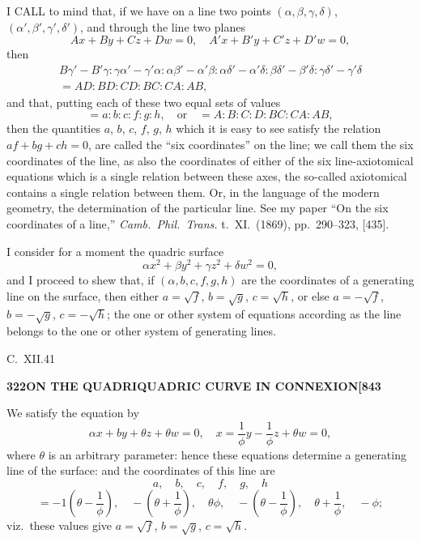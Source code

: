 \documentclass[11pt,a4paper]{book}
\begin{document}
\noindent I CALL to mind that, if we have on a line two points $(\alpha, \beta, \gamma, \delta)$, $(\alpha', \beta', \gamma', \delta')$, and through the line two planes
\[
Ax + By + Cz + Dw = 0, \quad A'x + B'y + C'z + D'w = 0,
\]
then
\begin{align*}
B\gamma' - B'\gamma : \gamma\alpha' - \gamma'\alpha : \alpha\beta' - \alpha'\beta : \alpha\delta' - \alpha'\delta : \beta\delta' - \beta'\delta : \gamma\delta' - \gamma'\delta \\
= AD : BD : CD : BC : CA : AB,
\end{align*}
and that, putting each of these two equal sets of values
\[
= a : b : c : f : g : h, \quad \text{or} \quad = A : B : C : D : BC : CA : AB,
\]
then the quantities $a$, $b$, $c$, $f$, $g$, $h$ which it is easy to see satisfy the relation $af + bg + ch = 0$, are called the ``six coordinates'' on the line; we call them the six coordinates of the line, as also the coordinates of either of the six line-axiotomical equations which is a single relation between these axes, the so-called axiotomical contains a single relation between them. Or, in the language of the modern geometry, the determination of the particular line. See my paper ``On the six coordinates of a line,'' \textit{Camb.\ Phil.\ Trans.} t.\ XI.\ (1869), pp.\ 290--323, [435].

I consider for a moment the quadric surface
\[
\alpha x^2 + \beta y^2 + \gamma z^2 + \delta w^2 = 0,
\]
and I proceed to shew that, if $(\alpha, b, c, f, g, h)$ are the coordinates of a generating line on the surface, then either $a = \sqrt{f}$, $b = \sqrt{g}$, $c = \sqrt{h}$, or else $a = -\sqrt{f}$, $b = -\sqrt{g}$, $c = -\sqrt{h}$; the one or other system of equations according as the line belongs to the one or other system of generating lines.

\hfill C.\ XII.\hfill 41

\newpage
\setcounter{page}{322}

\noindent\textbf{322}\hfill\textbf{ON THE QUADRIQUADRIC CURVE IN CONNEXION}\hfill\textbf{[843}

\bigskip

\noindent We satisfy the equation by
\[
\alpha x + by + \theta z + \theta w = 0, \quad x = \frac{1}{\phi}y - \frac{1}{\phi}z + \theta w = 0,
\]
where $\theta$ is an arbitrary parameter: hence these equations determine a generating line of the surface: and the coordinates of this line are
\[
a, \quad b, \quad c, \quad f, \quad g, \quad h
\]
\[
= -1\left(\theta - \frac{1}{\phi}\right), \quad -\left(\theta + \frac{1}{\phi}\right), \quad \theta\phi, \quad -\left(\theta - \frac{1}{\phi}\right), \quad \theta + \frac{1}{\phi}, \quad -\phi;
\]
viz.\ these values give $a = \sqrt{f}$, $b = \sqrt{g}$, $c = \sqrt{h}$.
\end{document}
